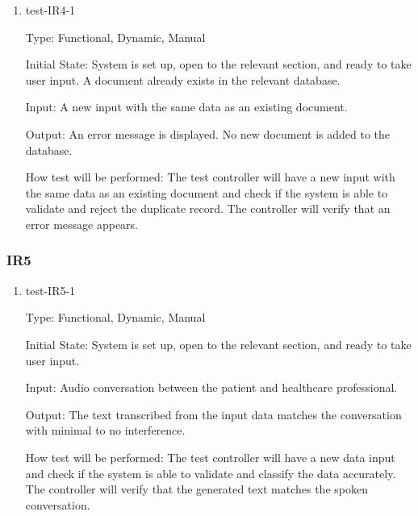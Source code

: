 \documentclass[12pt, titlepage]{article}
\begin{document}
  \begin{enumerate}

    \item{test-IR4-1} \label{test-IR4-1}
    
    Type: Functional, Dynamic, Manual
    
    Initial State: System is set up, open to the relevant section, and ready to take user input. A document already exists in the relevant database.

    Input: A new input with the same data as an existing document.
  
    Output: An error message is displayed. No new document is added to the database.  
    
    How test will be performed: The test controller will have a new input with the same data as an existing document and check if the system is able to validate and reject the duplicate record. The controller will verify that an error message appears.

  \end{enumerate}

  \subsubsection{IR5}
    
  \begin{enumerate}

    \item{test-IR5-1} \label{test-IR5-1}   
    
    Type: Functional, Dynamic, Manual
    
    Initial State: System is set up, open to the relevant section, and ready to take user input.

    Input: Audio conversation between the patient and healthcare professional.

    Output: The text transcribed from the input data matches the conversation with minimal to no interference.

    How test will be performed: The test controller will have a new data input and check if the system is able to validate and classify the data accurately. The controller will verify that the generated text matches the spoken conversation.

\end{enumerate}

\newpage
\end{document}

